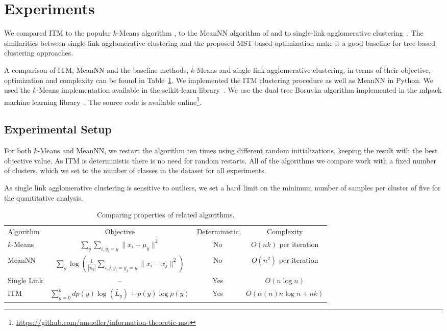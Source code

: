 \section{Experiments}
We compared ITM to the popular $k$-Means algorithm 
\citep{macqueen1967some,lloyd1982least}, to the MeanNN algorithm of
\citet{faivishevsky2010nonparametric} and to single-link agglomerative
clustering~\citep{gower1969minimum}. The similarities between single-link
agglomerative clustering and the proposed MST-based optimization make it a 
good baseline for tree-based clustering approaches.

A comparison of ITM, MeanNN and the baseline methods, $k$-Means and 
single link agglomerative clustering, in terms of their objective, 
optimization and complexity can be found in Table~\ref{nowotab}. 
We implemented the ITM clustering procedure as well as MeanNN in Python.  We
used the $k$-Means implementation available in the scikit-learn
library~\citep{pedregosa2011scikit}.  We use the dual tree Boruvka algorithm
implemented in the mlpack machine learning library~\citep{mlpack2011}. The source
code is available online\footnote{\url{https://github.com/amueller/information-theoretic-mst}}.
\enlargethispage{5mm}

\subsection{Experimental Setup}
For both $k$-Means and MeanNN, we restart the algorithm ten times using
different random initializations, keeping the result with the best objective
value. As ITM is deterministic there is no need for random restarts.  All of
the algorithms we compare work with a fixed number of clusters, which we set to
the number of classes in the dataset for all experiments.

As single link agglomerative clustering is sensitive to outliers, we set
a hard limit on the minimum number of samples per cluster of five for
the quantitative analysis.

\begin{table}[t]
\caption{Comparing properties of related algorithms.}\label{nowotab}
\centering
\begin{tabularx}{\linewidth}{@{\extracolsep{\fill}}lccc}
\toprule
Algorithm &     Objective &     Deterministic&      Complexity \\
\cmidrule{1-4}
$k$-Means &     $\displaystyle \sum_y \sum_{i, y_i = y} \| x_i - \mu_y \|^2$ & No  & $O(nk)$ per iteration
\\
MeanNN &    $\displaystyle \sum_y \log\left(\frac{1}{|\mathbf{x}_y|}\sum_{i,j, y_i=y_j=y} \| x_i - x_j \|^2 \right)$ & No & $O(n^2)$ per iteration\\
Single Link &   -- &    Yes    &    $O(n\log n)$\\
ITM & $\displaystyle \sum_{y=0}^k d p(y) \log(\bar{L}_y  ) + p(y) \log{p(y)}$ & Yes & $O(\alpha(n) n \log n + nk)$\\
\bottomrule
\end{tabularx}
\end{table}

